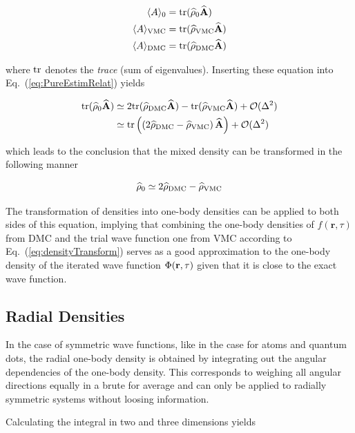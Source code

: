 \begin{align*}
 \langle A \rangle_0 &= \mathrm{tr}({\bf\widehat{\rho}}_0{\bf\widehat{A}}) \\
 \langle A \rangle_\mathrm{VMC} &= \mathrm{tr}({\bf\widehat{\rho}}_\mathrm{VMC}{\bf\widehat{A}}) \\
 \langle A \rangle_\mathrm{DMC} &= \mathrm{tr}({\bf\widehat{\rho}}_\mathrm{DMC}{\bf\widehat{A}}) 
 \end{align*}

where $\mathrm{tr}$ denotes the \textit{trace} (sum of eigenvalues\cite{leinaas}). Inserting these equation into Eq.~(\ref{eq:PureEstimRelat}) yields

\begin{align}
 \mathrm{tr}({\bf\widehat{\rho}}_0{\bf\widehat{A}}) &\simeq 2\mathrm{tr}({\bf\widehat{\rho}}_\mathrm{DMC}{\bf\widehat{A}}) -  \mathrm{tr}({\bf\widehat{\rho}}_\mathrm{VMC}{\bf\widehat{A}}) + \mathcal{O}(\Delta^2) \notag\\
  &\simeq \mathrm{tr}\left(\left(2{\bf\widehat{\rho}}_\mathrm{DMC} - {\bf\widehat{\rho}}_\mathrm{VMC}\right){\bf\widehat{A}}\right) + \mathcal{O}(\Delta^2)
\end{align}

which leads to the conclusion that the mixed density can be transformed in the following manner

\begin{equation}
 {\bf\widehat{\rho}}_0 \simeq 2{\bf\widehat{\rho}}_\mathrm{DMC} - {\bf\widehat{\rho}}_\mathrm{VMC} \label{eq:densityTransform}
\end{equation}

The transformation of densities into one-body densities can be applied to both sides of this equation, implying that combining the one-body densities of $f(\mathbf{r}, \tau)$ from DMC and the trial wave function one from VMC according to Eq.~(\ref{eq:densityTransform}) serves as a good approximation to the one-body density of the iterated wave function $\Phi(\mathbf{r}, \tau)$ given that it is close to the exact wave function.

\subsection{Radial Densities}

In the case of symmetric wave functions, like in the case for atoms and quantum dots, the radial one-body density is obtained by integrating out the angular dependencies of the one-body density. This corresponds to weighing all angular directions equally in a brute for average and can only be applied to radially symmetric systems without loosing information.

Calculating the integral in two and three dimensions yields

